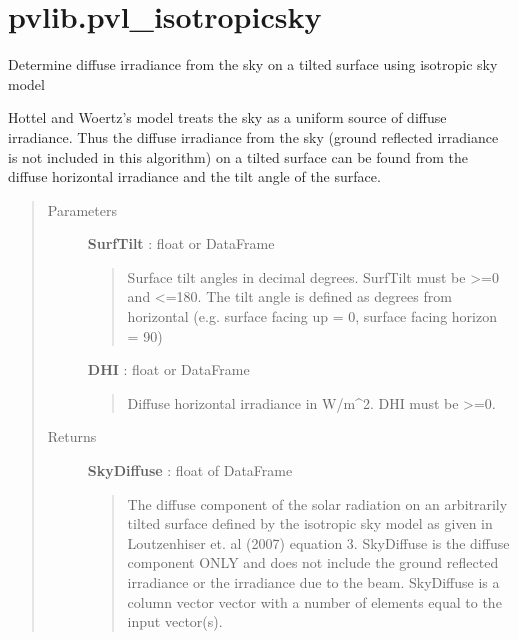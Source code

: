 \documentclass[letterpaper,10pt,english]{sphinxmanual}
\begin{document}
\section{pvlib.pvl\_isotropicsky}
\label{stubs/pvlib.pvl_isotropicsky::doc}\label{stubs/pvlib.pvl_isotropicsky:pvlib-pvl-isotropicsky}

\begin{fulllineitems}
\label{stubs/pvlib.pvl_isotropicsky:pvlib.pvl_isotropicsky}
Determine diffuse irradiance from the sky on a tilted surface using isotropic sky model

Hottel and Woertz's model treats the sky as a uniform source of diffuse
irradiance. Thus the diffuse irradiance from the sky (ground reflected
irradiance is not included in this algorithm) on a tilted surface can
be found from the diffuse horizontal irradiance and the tilt angle of
the surface.
\begin{quote}\begin{description}
\item[{Parameters}] \leavevmode
\textbf{SurfTilt} : float or DataFrame
\begin{quote}

Surface tilt angles in decimal degrees. 
SurfTilt must be \textgreater{}=0 and \textless{}=180. The tilt angle is defined as
degrees from horizontal (e.g. surface facing up = 0, surface facing
horizon = 90)
\end{quote}

\textbf{DHI} : float or DataFrame
\begin{quote}

Diffuse horizontal irradiance in W/m\textasciicircum{}2.
DHI must be \textgreater{}=0.
\end{quote}

\item[{Returns}] \leavevmode
\textbf{SkyDiffuse} : float of DataFrame
\begin{quote}

The diffuse component of the solar radiation  on an
arbitrarily tilted surface defined by the isotropic sky model as
given in Loutzenhiser et. al (2007) equation 3.
SkyDiffuse is the diffuse component ONLY and does not include the ground
reflected irradiance or the irradiance due to the beam.
SkyDiffuse is a column vector vector with a number of elements equal to
the input vector(s).
\end{quote}


\end{description}
\end{quote}
\end{fulllineitems}
\end{document}
